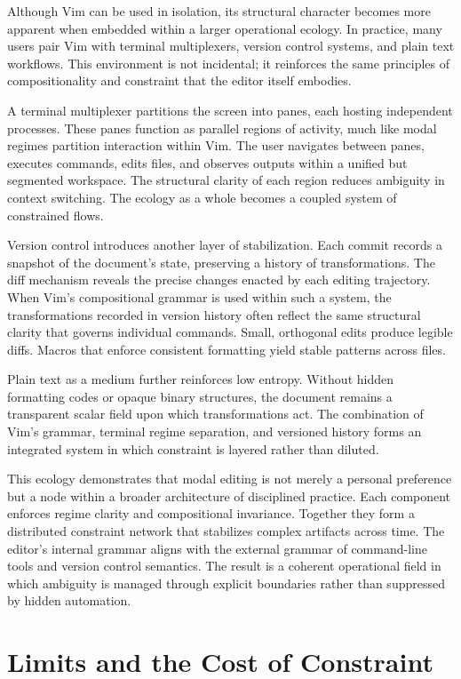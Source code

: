 \documentclass[12pt]{article}
\begin{document}
Although Vim can be used in isolation, its structural character becomes more apparent when embedded within a larger operational ecology. In practice, many users pair Vim with terminal multiplexers, version control systems, and plain text workflows. This environment is not incidental; it reinforces the same principles of compositionality and constraint that the editor itself embodies.

A terminal multiplexer partitions the screen into panes, each hosting independent processes. These panes function as parallel regions of activity, much like modal regimes partition interaction within Vim. The user navigates between panes, executes commands, edits files, and observes outputs within a unified but segmented workspace. The structural clarity of each region reduces ambiguity in context switching. The ecology as a whole becomes a coupled system of constrained flows.

Version control introduces another layer of stabilization. Each commit records a snapshot of the document’s state, preserving a history of transformations. The diff mechanism reveals the precise changes enacted by each editing trajectory. When Vim’s compositional grammar is used within such a system, the transformations recorded in version history often reflect the same structural clarity that governs individual commands. Small, orthogonal edits produce legible diffs. Macros that enforce consistent formatting yield stable patterns across files.

Plain text as a medium further reinforces low entropy. Without hidden formatting codes or opaque binary structures, the document remains a transparent scalar field upon which transformations act. The combination of Vim’s grammar, terminal regime separation, and versioned history forms an integrated system in which constraint is layered rather than diluted.

This ecology demonstrates that modal editing is not merely a personal preference but a node within a broader architecture of disciplined practice. Each component enforces regime clarity and compositional invariance. Together they form a distributed constraint network that stabilizes complex artifacts across time. The editor’s internal grammar aligns with the external grammar of command-line tools and version control semantics. The result is a coherent operational field in which ambiguity is managed through explicit boundaries rather than suppressed by hidden automation.

\section{Limits and the Cost of Constraint}
\end{document}
